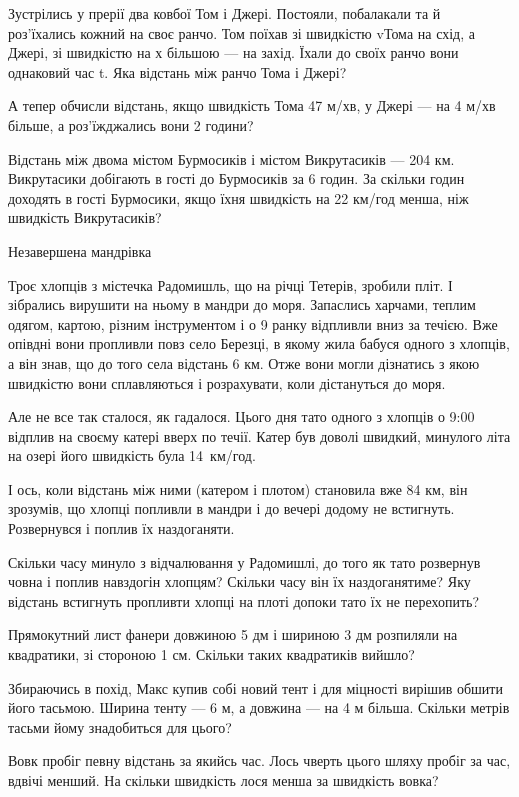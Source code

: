 \problem
Зустрілись у прерії два ковбої Том і Джері. Постояли, побалакали та й
роз’їхались кожний на своє ранчо. Том поїхав зі швидкістю vТома на схід,
а Джері, зі швидкістю на х більшою --- на захід. Їхали до своїх ранчо
вони однаковий час t. Яка відстань між ранчо Тома і Джері?

А тепер обчисли відстань, якщо швидкість Тома 47 м/хв,
у Джері --- на 4 м/хв більше, а роз’їжджались вони 2 години?


\problem
Відстань між двома містом Бурмосиків і містом Викрутасиків --- 204 км.
Викрутасики добігають в гості до Бурмосиків за 6 годин.
За скільки годин доходять в гості Бурмосики,
якщо їхня швидкість на 22 км/год менша, ніж швидкість Викрутасиків?


\problem
Незавершена мандрівка

Троє хлопців з містечка Радомишль, що на річці Тетерів, зробили пліт.
І зібрались вирушити на ньому в мандри до моря. Запаслись харчами,
теплим одягом, картою, різним інструментом і о 9 ранку відпливли вниз
за течією. Вже опівдні вони пропливли повз село Березці, в якому жила
бабуся одного з хлопців, а він знав, що до того села відстань 6 км.
Отже вони могли дізнатись з якою швидкістю вони сплавляються
і розрахувати, коли дістануться до моря.

Але не все так сталося, як гадалося. Цього дня тато одного з хлопців
о 9:00 відплив на своєму катері вверх по течії. Катер був доволі швидкий,
минулого літа на озері його швидкість була 14 км/год.

І ось, коли відстань між ними (катером і плотом) становила вже 84 км,
він зрозумів, що хлопці попливли в мандри і до вечері додому не встигнуть.
Розвернувся і поплив їх наздоганяти.

Скільки часу минуло з відчалювання у Радомишлі, до того як тато
розвернув човна і поплив навздогін хлопцям?
Скільки часу він їх наздоганятиме?
Яку відстань встигнуть пропливти хлопці на плоті допоки тато їх не перехопить?


\problem
Прямокутний лист фанери довжиною 5 дм і шириною 3 дм розпиляли на квадратики,
зі стороною 1 см.
Скільки таких квадратиків вийшло?


\problem
Збираючись в похід, Макс купив собі новий тент і для міцності вирішив
обшити його тасьмою. Ширина тенту --- 6 м, а довжина --- на 4 м більша.
Скільки метрів тасьми йому знадобиться для цього?


\problem
Вовк пробіг певну відстань за якийсь час.
Лось чверть цього шляху пробіг за час, вдвічі менший.
На скільки швидкість лося менша за швидкість вовка?


